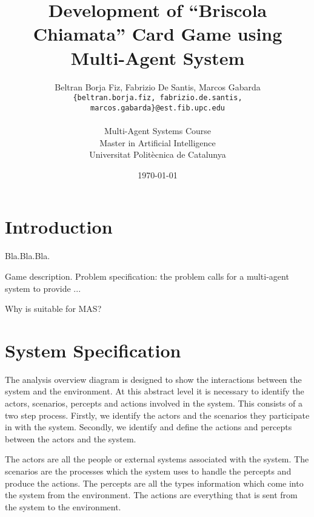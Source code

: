 \documentclass[a4paper]{article}
\begin{document}
\title{Development of ``Briscola Chiamata'' Card Game using Multi-Agent System}
 
\author{Beltran Borja Fiz, Fabrizio De Santis, Marcos Gabarda\\
\small \texttt{\{beltran.borja.fiz, fabrizio.de.santis, marcos.gabarda\}@est.fib.upc.edu}\\
\\
Multi-Agent Systems Course\\
Master in Artificial Intelligence\\
Universitat Polit\`ecnica de Catalunya}
\date{\today}

\newenvironment{fminipage}%
  {\begin{Sbox}\begin{minipage}}%
  {\end{minipage}\end{Sbox}\fbox{\TheSbox}}


\maketitle

\tableofcontents

\section{Introduction}\label{sec:intro}

Bla.Bla.Bla.

Game description. Problem specification: the problem calls for a multi-agent system to provide ...

Why is suitable for MAS?


\section{System Specification}\label{sec:sysspec} 

The analysis overview diagram is designed to show the interactions between the system and the environment. At this abstract level it is necessary to identify the actors, scenarios, percepts and actions involved in the system. This consists of a two step process. Firstly, we identify the actors and the scenarios they participate in with the system. Secondly, we identify and define the actions and percepts between the actors and the system.

The actors are all the people or external systems associated with the system. The scenarios are the processes which the system uses to handle the percepts and produce the actions. The percepts are all the types information which come into the system from the environment. The actions are everything that is sent from the system to the environment.
\end{document}
